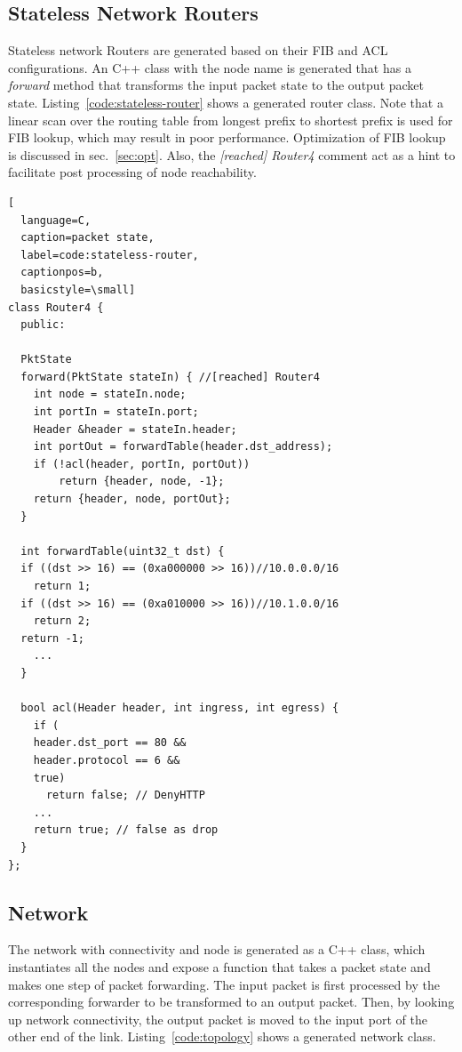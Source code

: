 \documentclass[letterpaper, 10 pt, conference]{ieeeconf}  %
\begin{document}
\subsection{Stateless Network Routers}
Stateless network Routers are generated based on their FIB and ACL configurations. An C++ class with the node name is generated that has a \emph{forward} method that transforms the input packet state to the output packet state. Listing~\ref{code:stateless-router} shows a generated router class. Note that a linear scan over the routing table from longest prefix to shortest prefix is used for FIB lookup, which may result in poor performance. Optimization of FIB lookup is discussed in sec.~\ref{sec:opt}. Also, the \emph{[reached] Router4} comment act as a hint to facilitate post processing of node reachability.

\begin{lstlisting}[
  language=C,
  caption=packet state,
  label=code:stateless-router,
  captionpos=b,
  basicstyle=\small]
class Router4 {
  public:
  
  PktState 
  forward(PktState stateIn) { //[reached] Router4
    int node = stateIn.node;
    int portIn = stateIn.port;
    Header &header = stateIn.header;
    int portOut = forwardTable(header.dst_address);
    if (!acl(header, portIn, portOut)) 
        return {header, node, -1};
    return {header, node, portOut};
  }
  
  int forwardTable(uint32_t dst) {
  if ((dst >> 16) == (0xa000000 >> 16))//10.0.0.0/16
    return 1;
  if ((dst >> 16) == (0xa010000 >> 16))//10.1.0.0/16
    return 2;
  return -1;
    ...
  }
  
  bool acl(Header header, int ingress, int egress) {
    if (
    header.dst_port == 80 &&
    header.protocol == 6 &&
    true)
      return false; // DenyHTTP
    ...
    return true; // false as drop
  }
};
\end{lstlisting}


\subsection{Network}

The network with connectivity and node is generated as a C++ class, which instantiates all the nodes and expose a function that takes a packet state and makes one step of packet forwarding. The input packet is first processed by the corresponding forwarder to be transformed to an output packet. Then, by looking up network connectivity, the output packet is moved to the input port of the other end of the link.  Listing~\ref{code:topology} shows a generated network class.
\end{document}
